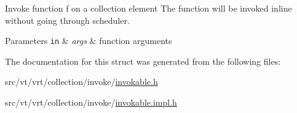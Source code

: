 Invoke function \textquotesingle{}f\textquotesingle{} on a collection element The function will be invoked inline without going through scheduler. 


\begin{DoxyParams}[1]{Parameters}
\mbox{\tt in}  & {\em args} & function arguments \\
\hline
\end{DoxyParams}


The documentation for this struct was generated from the following files\+:\begin{DoxyCompactItemize}
\item 
src/vt/vrt/collection/invoke/\hyperlink{invokable_8h}{invokable.\+h}\item 
src/vt/vrt/collection/invoke/\hyperlink{invokable_8impl_8h}{invokable.\+impl.\+h}\end{DoxyCompactItemize}
